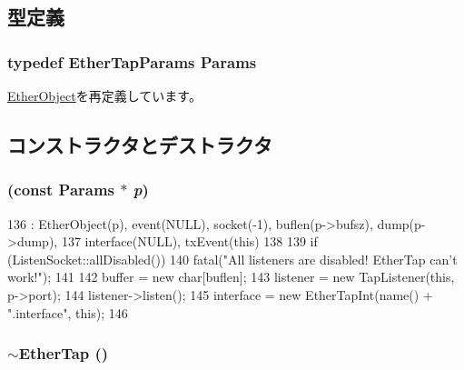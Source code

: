 \subsection{型定義}
\hypertarget{classEtherTap_a0d1f916d5d6c5769fc7f043e0f4a6372}{
\subsubsection[{Params}]{\setlength{\rightskip}{0pt plus 5cm}typedef EtherTapParams {\bf Params}}}
\label{classEtherTap_a0d1f916d5d6c5769fc7f043e0f4a6372}


\hyperlink{classEtherObject_a47be5a25ff75cbf22f60f87dde950e13}{EtherObject}を再定義しています。

\subsection{コンストラクタとデストラクタ}
\hypertarget{classEtherTap_aa3bb2beb8fedbc7bc7ef9fc307dd5273}{
\subsubsection[{EtherTap}]{ (const {\bf Params} $\ast$ {\em p})}}
\label{classEtherTap_aa3bb2beb8fedbc7bc7ef9fc307dd5273}



\begin{DoxyCode}
136     : EtherObject(p), event(NULL), socket(-1), buflen(p->bufsz), dump(p->dump),
137       interface(NULL), txEvent(this)
138 {
139     if (ListenSocket::allDisabled())
140         fatal("All listeners are disabled! EtherTap can't work!");
141 
142     buffer = new char[buflen];
143     listener = new TapListener(this, p->port);
144     listener->listen();
145     interface = new EtherTapInt(name() + ".interface", this);
146 }
\end{DoxyCode}
\hypertarget{classEtherTap_a75a9896777a8e11027761d41865c4e6d}{
\subsubsection[{$\sim$EtherTap}]{\setlength{\rightskip}{0pt plus 5cm}$\sim${\bf EtherTap} ()}}
\label{classEtherTap_a75a9896777a8e11027761d41865c4e6d}



